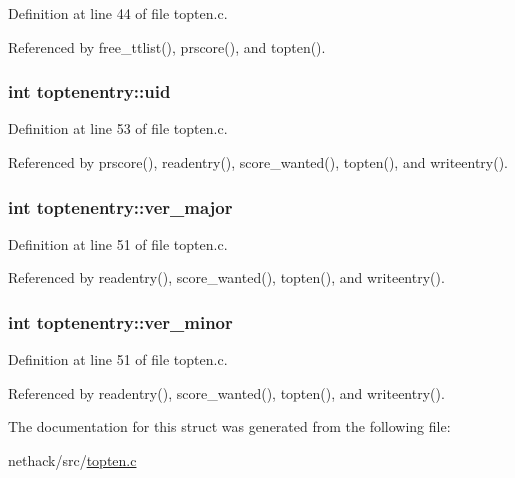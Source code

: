 Definition at line 44 of file topten.\+c.



Referenced by free\+\_\+ttlist(), prscore(), and topten().

\hypertarget{structtoptenentry_a95aa1dca4fdf2bdc4650909b3f0d1012}{
\subsubsection[{uid}]{\setlength{\rightskip}{0pt plus 5cm}int toptenentry\+::uid}}\label{structtoptenentry_a95aa1dca4fdf2bdc4650909b3f0d1012}


Definition at line 53 of file topten.\+c.



Referenced by prscore(), readentry(), score\+\_\+wanted(), topten(), and writeentry().

\hypertarget{structtoptenentry_a91bee7d2843edbebe8e9c140c7117ce2}{
\subsubsection[{ver\+\_\+major}]{\setlength{\rightskip}{0pt plus 5cm}int toptenentry\+::ver\+\_\+major}}\label{structtoptenentry_a91bee7d2843edbebe8e9c140c7117ce2}


Definition at line 51 of file topten.\+c.



Referenced by readentry(), score\+\_\+wanted(), topten(), and writeentry().

\hypertarget{structtoptenentry_a13b543c05d6cca789358c7d9e12e517d}{
\subsubsection[{ver\+\_\+minor}]{\setlength{\rightskip}{0pt plus 5cm}int toptenentry\+::ver\+\_\+minor}}\label{structtoptenentry_a13b543c05d6cca789358c7d9e12e517d}


Definition at line 51 of file topten.\+c.



Referenced by readentry(), score\+\_\+wanted(), topten(), and writeentry().



The documentation for this struct was generated from the following file\+:\begin{DoxyCompactItemize}
\item 
nethack/src/\hyperlink{topten_8c}{topten.\+c}\end{DoxyCompactItemize}
